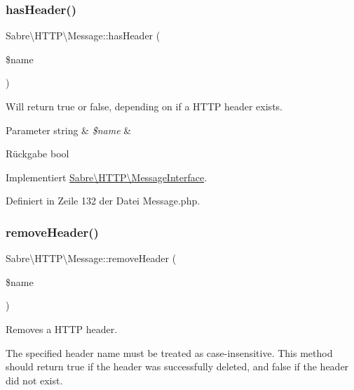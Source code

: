 \subsubsection{\texorpdfstring{has\+Header()}{hasHeader()}}
{\footnotesize\ttfamily Sabre\textbackslash{}\+H\+T\+T\+P\textbackslash{}\+Message\+::has\+Header (\begin{DoxyParamCaption}\item[{}]{\$name }\end{DoxyParamCaption})}

Will return true or false, depending on if a H\+T\+TP header exists.


\begin{DoxyParams}[1]{Parameter}
string & {\em \$name} & \\
\hline
\end{DoxyParams}
\begin{DoxyReturn}{Rückgabe}
bool 
\end{DoxyReturn}


Implementiert \mbox{\hyperlink{interface_sabre_1_1_h_t_t_p_1_1_message_interface_ac2cb6b88f6fc6cf05a2d751dc555ec0d}{Sabre\textbackslash{}\+H\+T\+T\+P\textbackslash{}\+Message\+Interface}}.



Definiert in Zeile 132 der Datei Message.\+php.

\mbox{\label{class_sabre_1_1_h_t_t_p_1_1_message_a0a6fae5616cd2131464eb1263e78c5c7}} 
\subsubsection{\texorpdfstring{remove\+Header()}{removeHeader()}}
{\footnotesize\ttfamily Sabre\textbackslash{}\+H\+T\+T\+P\textbackslash{}\+Message\+::remove\+Header (\begin{DoxyParamCaption}\item[{}]{\$name }\end{DoxyParamCaption})}

Removes a H\+T\+TP header.

The specified header name must be treated as case-\/insensitive. This method should return true if the header was successfully deleted, and false if the header did not exist.


